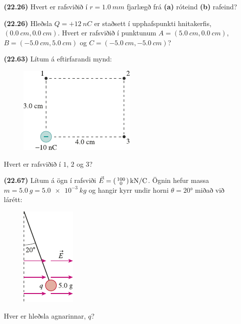 \begin{enumerate}[label = \textbf{(\alph*)}]

\item[\textbf{(22.26)}] Hvert er rafsviðið í $r = \SI{1.0}{mm}$ fjarlægð frá \textbf{(a)} róteind \textbf{(b)} rafeind?

\item[\textbf{(22.26)}] Hleðsla $Q = +\SI{12}{nC}$ er staðsett í upphafspunkti hnitakerfis, $(\SI{0.0}{cm}, \SI{0.0}{cm})$. Hvert er rafsviðið í punktunum $A = (\SI{5.0}{cm}, \SI{0.0}{cm})$, $B = (\SI{-5.0}{cm}, \SI{5.0}{cm})$ og $C = (\SI{-5.0}{cm}, \SI{-5.0}{cm})$?

\item[\textbf{(22.63)}] Lítum á eftirfarandi mynd:

\begin{figure}[H]
    \centering
    \includegraphics{figures/rk2263.pdf}
\end{figure}
Hvert er rafsviðið í $1$, $2$ og $3$?

\item[\textbf{(22.67)}] Lítum á ögn í rafsviði $\vec{E} = \smqty(100 \\ 0) \, \si{kN/C}$. Ögnin hefur massa $m = \SI{5.0}{g} = \SI{5.0e-3}{kg}$ og hangir kyrr undir horni $\theta = \ang{20}$ miðað við lárétt:
\begin{figure}[H]
    \centering
    \includegraphics{figures/rk2267.pdf}
\end{figure}
Hver er hleðsla agnarinnar, $q$?

\end{enumerate}

